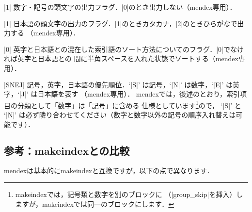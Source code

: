 \documentclass[a4paper,dvipdfmx]{jsarticle}
\newcommand{\SoftName}[1]{\textsf{#1}}
\begin{document}
\begin{description}[leftmargin=3.5cm]
\item[|symbol\string_flag|] \ParamNum|1|
数字・記号の頭文字の出力フラグ．|0|のとき出力しない（\SoftName{mendex}専用）．

\item[|letter\string_head|] \ParamNum|1|
日本語の頭文字の出力のフラグ．|1|のときカタカナ，|2|のときひらがなで出力する
（\SoftName{mendex}専用）．

\item[|priority|] \ParamNum|0|
英字と日本語との混在した索引語のソート方法についてのフラグ．|0|でなければ英字と日本語との
間に半角スペースを入れた状態でソートする（\SoftName{mendex}専用）．

\item[|character\string_order|] \ParamString*|SNEJ|
記号，英字，日本語の優先順位．`|S|' は記号，`|N|' は数字，`|E|' は英字，`|J|' は日本語を表す
（\SoftName{mendex}専用）．
\SoftName{mendex}では，後述のとおり，索引項目の分類として「数字」は「記号」に含める
仕様としています\footnote{\SoftName{makeindex}では，記号類と数字を別のブロックに
（|group\_skip|を挿入）しますが，\SoftName{makeindex}では同一のブロックにします．}ので，
`|S|' と `|N|' は必ず隣り合わせてください（数字と数字以外の記号の順序入れ替えは可能です）．
\end{description}

\subsection{参考：\SoftName{makeindex}との比較}
\SoftName{mendex}は基本的に\SoftName{makeindex}と互換ですが，以下の点で異なります．
\end{document}
